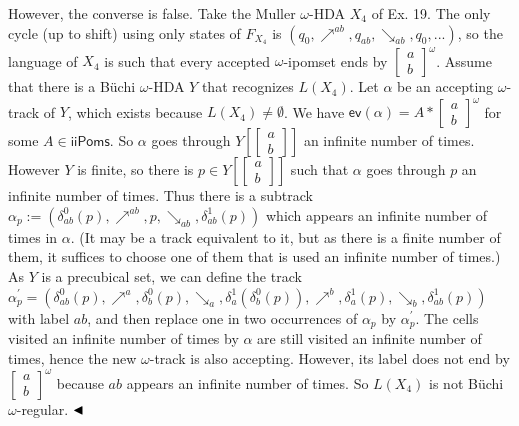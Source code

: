 However, the converse is false. Take the Muller $\omega$-HDA $X_{4}$ of Ex. 19. The only cycle (up to shift) using only states of $F_{X_{4}}$ is $(q_{0},\mathrel{\nearrow^{ab}},q_{ab},\mathrel{\searrow_{ab}},q_{0},...)$, so the language of $X_{4}$ is such that every accepted $\omega$-ipomset ends by $\left[\begin{smallmatrix}a\\
b\end{smallmatrix}\right]^{\omega}$. Assume that there is a Büchi $\omega$-HDA $Y$ that recognizes $L(X_{4})$. Let $\alpha$ be an accepting $\omega$-track of $Y$, which exists because $L(X_{4})\neq\emptyset$. We have $\mathsf{ev}(\alpha)=A*\left[\begin{smallmatrix}a\\
b\end{smallmatrix}\right]^{\omega}$ for some $A\in\mathsf{iiPoms}$. So $\alpha$ goes through $Y[\left[\begin{smallmatrix}a\\
b\end{smallmatrix}\right]]$ an infinite number of times. However $Y$ is finite, so there is $p\in Y[\left[\begin{smallmatrix}a\\
b\end{smallmatrix}\right]]$ such that $\alpha$ goes through $p$ an infinite number of times. Thus there is a subtrack $\alpha_{p}:=(\delta^{0}_{ab}(p),\mathrel{\nearrow^{ab}},p,\mathrel{\searrow_{ab}},\delta^{1}_{ab}(p))$ which appears an infinite number of times in $\alpha$. (It may be a track equivalent to it, but as there is a finite number of them, it suffices to choose one of them that is used an infinite number of times.) As $Y$ is a precubical set, we can define the track $\alpha^{\prime}_{p}=(\delta^{0}_{ab}(p),\mathrel{\nearrow^{a}},\delta^{0}_{b}(p),\mathrel{\searrow_{a}},\delta^{1}_{a}(\delta^{0}_{b}(p)),\mathrel{\nearrow^{b}},\delta^{1}_{a}(p),\mathrel{\searrow_{b}},\delta^{1}_{ab}(p))$ with label $ab$, and then replace one in two occurrences of $\alpha_{p}$ by $\alpha^{\prime}_{p}$. The cells visited an infinite number of times by $\alpha$ are still visited an infinite number of times, hence the new $\omega$-track is also accepting. However, its label does not end by $\left[\begin{smallmatrix}a\\
b\end{smallmatrix}\right]^{\omega}$ because $ab$ appears an infinite number of times. So $L(X_{4})$ is not Büchi $\omega$-regular. $\hfill\blacktriangleleft$\par
 
